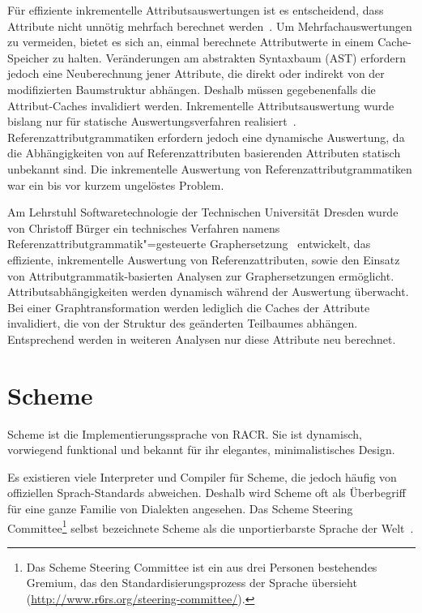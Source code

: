 Für effiziente inkrementelle Attributsauswertungen ist es entscheidend, dass Attribute nicht unnötig mehrfach berechnet werden~\cite{MaddoxIII1997}. Um Mehrfachauswertungen zu vermeiden, bietet es sich an, einmal berechnete Attributwerte in einem Cache-Speicher zu halten. Veränderungen am abstrakten Syntaxbaum (AST) erfordern jedoch eine Neuberechnung jener Attribute, die direkt oder indirekt von der modifizierten Baumstruktur abhängen. Deshalb müssen gegebenenfalls die Attribut-Caches invalidiert werden. Inkrementelle Attributsauswertung wurde bislang nur für statische Auswertungsverfahren realisiert~\cite{Buerger2012,Soederberg2012}. Referenzattributgrammatiken erfordern jedoch eine dynamische Auswertung, da die Abhängigkeiten von auf Referenzattributen basierenden Attributen statisch unbekannt sind. Die inkrementelle Auswertung von Referenzattributgrammatiken war ein bis vor kurzem ungelöstes Problem.

Am Lehrstuhl Softwaretechnologie der Technischen Universität Dresden wurde von Christoff Bürger ein technisches Verfahren namens Referenzattributgrammatik"=gesteuerte Graphersetzung~\cite{Buerger2012,Buerger2015b} entwickelt, das effiziente, inkrementelle Auswertung von Referenzattributen, sowie den Einsatz von Attributgrammatik-basierten Analysen zur Graphersetzungen ermöglicht. Attributsabhängigkeiten werden dynamisch während der Auswertung überwacht. Bei einer Graphtransformation werden lediglich die Caches der Attribute invalidiert, die von der Struktur des geänderten Teilbaumes abhängen. Entsprechend werden in weiteren Analysen nur diese Attribute neu berechnet.

\section{Scheme}

Scheme ist die Implementierungssprache von RACR. Sie ist dynamisch, vorwiegend funktional und bekannt für ihr elegantes, minimalistisches Design.

Es existieren viele Interpreter und Compiler für Scheme, die jedoch häufig von offiziellen Sprach-Standards abweichen. Deshalb wird Scheme oft als Überbegriff für eine ganze Familie von Dialekten angesehen. Das Scheme Steering Committee\footnote{Das Scheme Steering Committee ist ein aus drei Personen bestehendes Gremium, das den Standardisierungsprozess der Sprache übersieht (\url{http://www.r6rs.org/steering-committee/}).} selbst bezeichnete Scheme als die unportierbarste Sprache der Welt~\cite{Clinger2009}.

